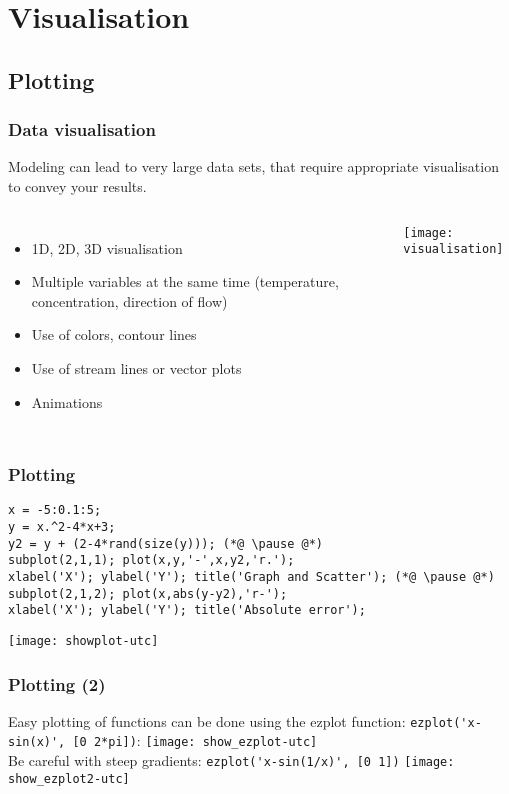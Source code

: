 \section{Visualisation}
\subsection*{Plotting}
\begin{frame}
 \frametitle{Data visualisation}
 Modeling can lead to very large data sets, that require appropriate visualisation to convey your results.
 \begin{columns}
    \begin{itemize}
      \item 1D, 2D, 3D visualisation
      \item Multiple variables at the same time (temperature, concentration, direction of flow)
      \item Use of colors, contour lines
      \item Use of stream lines or vector plots
      \item Animations
    \end{itemize}
   \centering\texttt{[image: visualisation]}
 \end{columns}
\end{frame}

\begin{frame}[fragile]
  \frametitle{Plotting}
  \begin{lstlisting}
x = -5:0.1:5;
y = x.^2-4*x+3;
y2 = y + (2-4*rand(size(y))); (*@ \pause @*)
subplot(2,1,1); plot(x,y,'-',x,y2,'r.');
xlabel('X'); ylabel('Y'); title('Graph and Scatter'); (*@ \pause @*)
subplot(2,1,2); plot(x,abs(y-y2),'r-');
xlabel('X'); ylabel('Y'); title('Absolute error');
  \end{lstlisting}
  \centering\texttt{[image: showplot-utc]}
\end{frame}

\begin{frame}[fragile]
  \frametitle{Plotting (2)}
  Easy plotting of functions can be done using the ezplot function: \lstinline$ezplot('x-sin(x)', [0 2*pi])$:
  \texttt{[image: show\_ezplot-utc]}\\
  Be careful with steep gradients: \lstinline$ezplot('x-sin(1/x)', [0 1])$%
  \texttt{[image: show\_ezplot2-utc]}
\end{frame}

